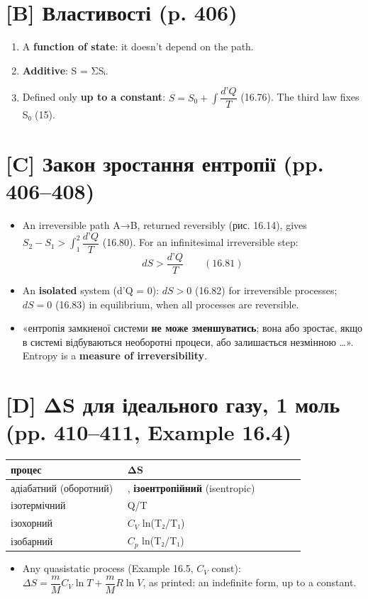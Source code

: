 \documentclass[11pt,a4paper,oneside]{book}
\begin{document}
\section*{[B] Властивості (p. 406)}
\begin{enumerate}
\item A \textbf{function of state}: it doesn't depend on the path.
\item \textbf{Additive}: S = ΣSᵢ.
\item Defined only \textbf{up to a constant}: $S = S_0 + \int\dfrac{d\text{'}Q}T$ (16.76). The third law fixes S₀ (15).
\end{enumerate}

\section*{[C] Закон зростання ентропії (pp. 406–408)}
\begin{itemize}
\item An irreversible path A→B, returned reversibly (рис. 16.14), gives $S_2 - S_1 > \int_1^2\dfrac{d\text{'}Q}T$ (16.80). For an infinitesimal irreversible step:
\[dS > \frac{d\text{'}Q}T\qquad(16.81)\]
\item An \textbf{isolated} system (d'Q = 0): $dS > 0$ (16.82) for irreversible processes; $dS = 0$ (16.83) in equilibrium, when all processes are reversible.
\item «ентропія замкненої системи \textbf{не може зменшуватись}; вона або зростає, якщо в системі відбуваються необоротні процеси, або залишається незмінною …». Entropy is a \textbf{measure of irreversibility}.
\end{itemize}

\section*{[D] ΔS для ідеального газу, 1 моль (pp. 410–411, Example 16.4)}
{\small
\begin{longtable}{>{\raggedright\arraybackslash}p{0.380\linewidth}>{\raggedright\arraybackslash}p{0.588\linewidth}}
\toprule
\textbf{процес} & \textbf{ΔS} \\
\midrule
\endhead
адіабатний (оборотний) & 0, \textbf{ізоентропійний} (isentropic) \\
ізотермічний & Q/T \\
ізохорний & $C_{V}$ ln(T₂/T₁) \\
ізобарний & $C_{p}$ ln(T₂/T₁) \\
\bottomrule
\end{longtable}
}
\begin{itemize}
\item Any quasistatic process (Example 16.5, $C_{V}$ const): $\Delta S = \dfrac mMC_V\ln T + \dfrac mMR\ln V$, as printed: an indefinite form, up to a constant.
\end{itemize}
\end{document}
